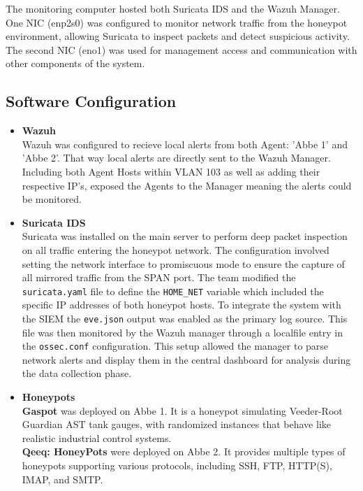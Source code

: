 \documentclass[11pt,a4paper]{article}
\newcommand{\techterm}[1]{\texttt{#1}}
\begin{document}
The monitoring computer hosted both Suricata IDS and the Wazuh Manager. One NIC (enp2s0) was configured to monitor network traffic from the honeypot environment, allowing Suricata to inspect packets and detect suspicious activity. The second NIC (eno1) was used for management access and communication with other components of the system.
\subsection{Software Configuration}
\begin{itemize}
    \item \textbf{Wazuh}
    \\ Wazuh was configured to recieve local alerts from both Agent: 'Abbe 1' and 'Abbe 2'. That way local alerts are directly sent to the Wazuh Manager. Including both Agent Hosts within VLAN 103 as well as adding their respective IP's, exposed the Agents to the Manager meaning the alerts could be monitored. 
    
    \item \textbf{Suricata IDS}
    \\ Suricata was installed on the main server to perform deep packet inspection on all traffic entering the honeypot network. The configuration involved setting the network interface to promiscuous mode to ensure the capture of all mirrored traffic from the SPAN port. The team modified the \techterm{suricata.yaml} file to define the \techterm{HOME\_NET} variable which included the specific IP addresses of both honeypot hosts. To integrate the system with the SIEM the \techterm{eve.json} output was enabled as the primary log source. This file was then monitored by the Wazuh manager through a localfile entry in the \techterm{ossec.conf} configuration. This setup allowed the manager to parse network alerts and display them in the central dashboard for analysis during the data collection phase.
    
    \item \textbf{Honeypots}
    \\ \textbf{Gaspot}\cite{GasPotGithub} was deployed on Abbe 1. It is a honeypot simulating Veeder-Root Guardian AST tank gauges, with randomized instances that behave like realistic industrial control systems.  
    \\ \textbf{Qeeq: HoneyPots}\cite{QeeqboxHoneypotsGithub} were deployed on Abbe 2. It provides multiple types of honeypots supporting various protocols, including SSH, FTP, HTTP(S), IMAP, and SMTP.  
    

\end{itemize}
\end{document}
